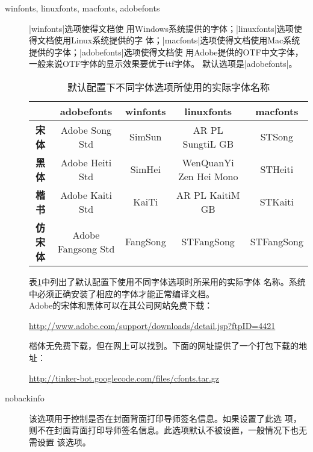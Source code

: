\begin{description}
\item[winfonts, linuxfonts, macfonts, adobefonts] |winfonts|选项使得文档使
  用Windows系统提供的字体；|linuxfonts|选项使得文档使用Linux系统提供的字
  体；|macfonts|选项使得文档使用Mac系统提供的字体；|adobefonts|选项使得文档使
  用Adobe提供的OTF中文字体，一般来说OTF字体的显示效果要优于ttf字体。
  默认选项是|adobefonts|。
  \begin{table}
    \centering\noindent\small
    \begin{tabular}[t]{ccccc}
    \toprule
          & \textbf{adobefonts} &  \textbf{winfonts} & \textbf{linuxfonts} & \textbf{macfonts} \\
    \midrule
     \textbf{宋体} & {Adobe Song Std}  & {SimSun} & {AR PL SungtiL GB} &  {STSong} \\
     \textbf{黑体} & {Adobe Heiti Std} & {SimHei} & {WenQuanYi Zen Hei Mono} &  {STHeiti} \\
     \textbf{楷书} & {Adobe Kaiti Std} & {KaiTi}  & {AR PL KaitiM GB} & {STKaiti} \\
     \textbf{仿宋体} & {Adobe Fangsong Std} & {FangSong} & {STFangSong} & {STFangSong} \\
    \bottomrule
    \end{tabular}
    \caption{默认配置下不同字体选项所使用的实际字体名称}
    \label{table:fontnames}
  \end{table}
  表\ref{table:fontnames}中列出了默认配置下使用不同字体选项时所采用的实际字体
  名称。系统中必须正确安装了相应的字体才能正常编译文档。\\
  Adobe的宋体和黑体可以在其公司网站免费下载：
  \begin{center}
  \url{http://www.adobe.com/support/downloads/detail.jsp?ftpID=4421}
  \end{center}
  楷体无免费下载，但在网上可以找到。下面的网址提供了一个打包下载的地址：
  \begin{center}
  \url{http://tinker-bot.googlecode.com/files/cfonts.tar.gz}
  \end{center}

\item[nobackinfo] 该选项用于控制是否在封面背面打印导师签名信息。如果设置了此选
  项，则不在封面背面打印导师签名信息。此选项默认不被设置，一般情况下也无需设置
  该选项。


\end{description}
